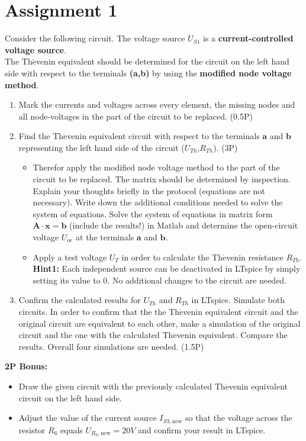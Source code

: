\documentclass[a4paper]{article}
\begin{document}
	\section{Assignment 1}
	Consider the following circuit. The voltage source $U_{S1}$ is a \textbf{current-controlled voltage source}.\\
	The Th$\acute{\text{e}}$venin equivalent should be determined for the circuit on the left hand side with respect to the terminals \textbf{(a,b)} by using the \textbf{\textcolor[rgb]{1,0,0}{modified} node voltage method}.
	\begin{enumerate}
		\item  Mark the currents and voltages across every element, the missing nodes and all node-voltages in the part of the circuit to be replaced. (0.5P)
		\item Find the Th$\acute{\text{e}}$venin equivalent circuit with respect to the terminals $\mathbf{a}$ and $\mathbf{b}$ representing the left hand side of the circuit ($U_{Th}$,$R_{Th}$). (3P)
		\begin{itemize} 
			\item Therefor apply the modified node voltage method to the part of the circuit to be replaced. The matrix should be determined by inspection. Explain your thoughts briefly in the protocol (equations are not necessary). Write down the additional conditions needed to solve the system of equations. Solve the system of equations in matrix form $\mathbf{A}\cdot \mathbf{x} = \mathbf{b}$ (include the results!) in Matlab and determine the open-circuit voltage $U_{\text{oc}}$ at the terminals $\mathbf{a}$ and $\mathbf{b}$.
			\item Apply a test voltage $U_T$ in order to calculate the Th$\acute{\text{e}}$venin resistance $R_{Th}$. \\
			\textbf{Hint1:} Each independent source can be deactivated in LTspice by simply setting its value to 0. No additional changes to the circuit are needed.
		\end{itemize}
		\item Confirm the calculated results for $U_{Th}$ and $R_{Th}$ in LTspice. Simulate both circuits. In order to confirm that the the Th$\acute{\text{e}}$venin equivalent circuit and the original circuit are equivalent to each other, make a simulation of the original circuit and the one with the calculated Th$\acute{\text{e}}$venin equivalent. Compare the results. Overall four simulations are needed. (1.5P)		
	\end{enumerate} 
			\textbf{2P Bonus:}
			\begin{itemize} 
				\item Draw the given circuit with the previously calculated Th$\acute{\text{e}}$venin equivalent circuit on the left hand side.
				\item Adjust the value of the current source $I_{S3,\text{new}}$ so that the voltage across the resistor $R_6$ equals $U_{R_6,\text{new}}=20V$ and confirm your result in LTspice.
			\end{itemize}
\vspace*{3.5cm}
\end{document}
